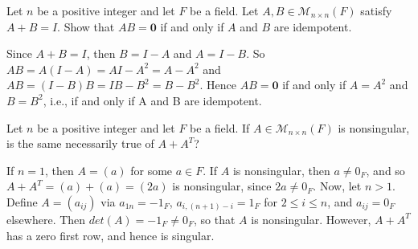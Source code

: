 \probskip

\begin{ex}[Golan 467]
Let $n$ be a positive integer and let $F$ be a field.  Let 
$A, B\in \mathcal{M}_{n\times n}(F)$ satisfy $A + B = I$.  Show that $AB = \mathbf{0}$
if and only if $A$ and $B$ are idempotent.
\end{ex}

\smallskip
\begin{solution}

Since $A + B = I$, then $B = I - A$ and $A = I - B$. So $AB = A(I - A) = AI - A^2 = A - A^2$ 
and $AB = (I - B)B = IB - B^2 = B - B^2$. Hence $AB = \mathbf{0}$ if and only if $A = A^2$ and 
$B = B^2$, i.e., if and only if A and B are idempotent.

\end{solution}

\probskip

\begin{ex}[Golan 530]
Let $n$ be a positive integer and let $F$ be a field.  If
$A \in \mathcal{M}_{n\times n}(F)$ is nonsingular, is the same necessarily true
of $A + A^T$?
\end{ex}

\smallskip
\begin{solution}

If $n=1$, then $A=(a)$ for some $a \in F$. If $A$ is nonsingular, then $a \ne 0_F$, and so 
$A + A^T = (a) + (a) = (2a)$ is nonsingular, since $2a \ne 0_F$.
\smallskip
Now, let $n > 1$. Define $A = (a_{ij})$ via $a_{1n} = -1_F$, $a_{i,(n+1)-i} = 1_F$ for $2 \le i \le n$, 
and $a_{ij} = 0_F$ elsewhere. Then $det(A) = -1_F \ne 0_F$, so that $A$ is nonsingular. 
However, $A + A^T$ has a zero first row, and hence is singular.

\end{solution}

%
%


